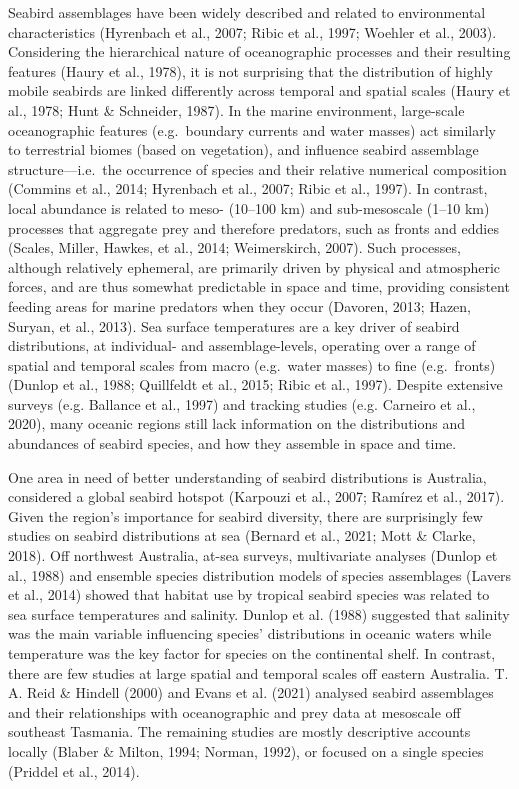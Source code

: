 \documentclass{article}
\begin{document}
\begin{linenumbers}
Seabird assemblages have been widely described and related to environmental characteristics (Hyrenbach et al., 2007; Ribic et al., 1997; Woehler et al., 2003). Considering the hierarchical nature of oceanographic processes and their resulting features (Haury et al., 1978), it is not surprising that the distribution of highly mobile seabirds are linked differently across temporal and spatial scales (Haury et al., 1978; Hunt \& Schneider, 1987). In the marine environment, large-scale oceanographic features (e.g.~boundary currents and water masses) act similarly to terrestrial biomes (based on vegetation), and influence seabird assemblage structure---i.e.~the occurrence of species and their relative numerical composition (Commins et al., 2014; Hyrenbach et al., 2007; Ribic et al., 1997). In contrast, local abundance is related to meso- (10--100 km) and sub-mesoscale (1--10 km) processes that aggregate prey and therefore predators, such as fronts and eddies (Scales, Miller, Hawkes, et al., 2014; Weimerskirch, 2007). Such processes, although relatively ephemeral, are primarily driven by physical and atmospheric forces, and are thus somewhat predictable in space and time, providing consistent feeding areas for marine predators when they occur (Davoren, 2013; Hazen, Suryan, et al., 2013). Sea surface temperatures are a key driver of seabird distributions, at individual- and assemblage-levels, operating over a range of spatial and temporal scales from macro (e.g.~water masses) to fine (e.g.~fronts) (Dunlop et al., 1988; Quillfeldt et al., 2015; Ribic et al., 1997). Despite extensive surveys (e.g. Ballance et al., 1997) and tracking studies (e.g. Carneiro et al., 2020), many oceanic regions still lack information on the distributions and abundances of seabird species, and how they assemble in space and time.

One area in need of better understanding of seabird distributions is Australia, considered a global seabird hotspot (Karpouzi et al., 2007; Ramírez et al., 2017). Given the region's importance for seabird diversity, there are surprisingly few studies on seabird distributions at sea (Bernard et al., 2021; Mott \& Clarke, 2018). Off northwest Australia, at-sea surveys, multivariate analyses (Dunlop et al., 1988) and ensemble species distribution models of species assemblages (Lavers et al., 2014) showed that habitat use by tropical seabird species was related to sea surface temperatures and salinity. Dunlop et al. (1988) suggested that salinity was the main variable influencing species' distributions in oceanic waters while temperature was the key factor for species on the continental shelf. In contrast, there are few studies at large spatial and temporal scales off eastern Australia. T. A. Reid \& Hindell (2000) and Evans et al. (2021) analysed seabird assemblages and their relationships with oceanographic and prey data at mesoscale off southeast Tasmania. The remaining studies are mostly descriptive accounts locally (Blaber \& Milton, 1994; Norman, 1992), or focused on a single species (Priddel et al., 2014).


\end{linenumbers}
\end{document}
